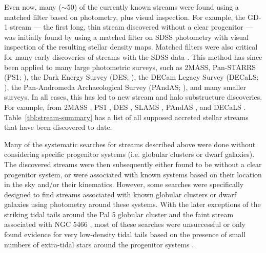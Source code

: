 \documentclass[final,5p,times,twocolumn,authoryear]{elsarticle}
\begin{document}
Even now, many ($\sim$50) of the currently known streams were found using a matched
filter based on photometry, plus visual inspection.
For example, the GD-1 stream --- the first long, thin stream discovered without a clear
progenitor --- was initially found by \citet{grillmair:2006-gd1} using a matched filter
on SDSS photometry with visual inspection of the resulting stellar density maps.
Matched filters were also critical for many early discoveries of streams with the SDSS
data \citep[e.g.,][]{Newberg:2002, Yanny:2003, belokurov:2006, grillmair:2006-orphan}.
This method has since been applied to many large photometric surveys, such as 2MASS,
Pan-STARRS (PS1; \citealt{chambers:2016}), the Dark Energy Survey (DES;
\citealt{des:2005, des:2016}), the DECam Legacy Survey  (DECaLS; \citealt{dey:2019}),
the Pan-Andromeda Archaeological Survey (PAndAS; \citealt{mcconnachie:2009}),
and many smaller surveys.
In all cases, this has led to new stream and halo substructure discoveries.
For example, from 2MASS \citep{rocha-pinto:2003, rocha-pinto:2004}, PS1
\citep{bernard:2014, bernard:2016, navarrete:2017}, DES \citep{shipp:2018}, SLAMS
\citep{jethwa:2018}, PAndAS \citep{martin:2014}, and DECaLS \citep{shipp:2020}.
Table~\ref{tbl:stream-summary} has a list of all supposed accreted stellar streams that
have been discovered to date.

Many of the systematic searches for streams described above were done without
considering specific progenitor systems (i.e. globular clusters or dwarf galaxies).
The discovered streams were then subsequently either found to be without a clear
progenitor system, or were associated with known systems based on their location in the
sky and/or their kinematics.
However, some searches were specifically designed to find streams associated with known
globular clusters or dwarf galaxies \citep[e.g.,][]{grillmair:1995, kuhn:1996,
leon:2000} using photometry around these systems.
With the later exceptions of the striking tidal tails around the Pal 5 globular cluster
\citep{odenkirchen:2001} and the faint stream associated with NGC 5466
\citep{grillmair:2006-ngc5466}, most of these searches were unsuccessful or only found
evidence for very low-density tidal tails based on the presence of small numbers of
extra-tidal stars around the progenitor systems \citep{grillmair:1995, leon:2000}.
\end{document}
